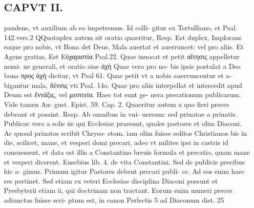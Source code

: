 \documentclass{article}
\begin{document}
\begin{pages}
\section*{CAPVT  II. }
\marginpar{[ p.45 ]}\pstart pandens, vt auxilium ab eo impetremus. Id colli- gitur ex Tertulliano, et Psal. 142.vers.2 QQuotuplex autem sit oratio quaeritur, Resp. Est duplex, Implorans eaque pro nobis, vt Bona det Deus, Mala auertat et auerruncet: vel pro aliis. Et Agens gratias, Est Εὐχαριστία Psal.22. Quae inuocat et petit αἴτησις appelletur nomi- ne generali, et oratio siue ἀχὴ  Quae vero pro no- bis ipsis postulat a Deo bona προς ἀχὴ  dicitur, vt Psal 61. Quae petit vt a nobis auerruncentur et a- bigantur mala, δένσις vti Psal. 14o. Quae pro aliis interpellat et intercedit apud Deum est ἔντάξις, vel μεσιτεία. Haec tot sunt ge- nera precationum publicarum. Vide tamen Au- gust. Epist. 59. Cap. 2. Quaeritur autem a quo fieri preces debeant et possint. Resp. Ab omnibus in vni- uersum: sed priuatae a priuatis. Publicae vero a solis iis qui Ecclesiae praesunt, quales pastores et olim Diaconi. Ac quoad priuatos scribit Chryso- stom. iam olim fuisse solitos Christianos bis in die, scilicet, mane, et vesperi domi precari, adeo vt milites ipsi in castris id consuessent, et data est illis a Constantino breuis formula et precatio, quam mane et vesperi dicerent. Eusebius lib. 4. de vita Constantini. Sed de publicis precibus hic a- gimus. Primum igitur Pastores debent precari publi- ce. Ad eos enim haec res pertinet. Sed etiam ex veteri Ecclesiae disciplina Diaconi possunt et Presbyterii etiam ii, qui doctrinam non tractant. Eorum enim muneri preces adiunctas fuisse scri- ptum est, in canon Perlectis 5 ad Diaconum dist. 25  \pend

\end{pages}
\end{document}
